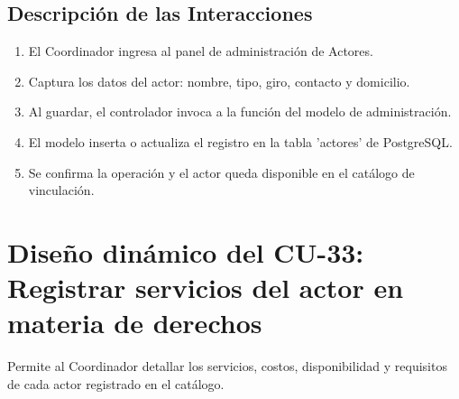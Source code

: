\subsection{Descripción de las Interacciones}
\begin{enumerate}
    \item El Coordinador ingresa al panel de administración de Actores.
    \item Captura los datos del actor: nombre, tipo, giro, contacto y domicilio.
    \item Al guardar, el controlador invoca a la función del modelo de administración.
    \item El modelo inserta o actualiza el registro en la tabla 'actores' de PostgreSQL.
    \item Se confirma la operación y el actor queda disponible en el catálogo de vinculación.
\end{enumerate}

\cleardoublepage
\section{Diseño dinámico del CU-33: Registrar servicios del actor en materia de derechos}
\label{sec:disenoDinamicoCU33}

Permite al Coordinador detallar los servicios, costos, disponibilidad y requisitos de cada actor registrado en el catálogo.

